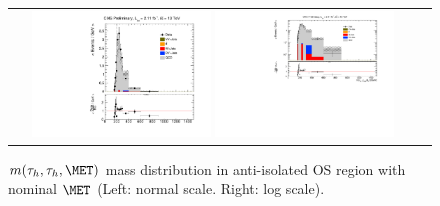 

 \begin{figure}[tbhp!]
      \centering
      \begin{tabular}{cc}
        \includegraphics[width=0.45\textwidth]{QCDBGEst_Closure_SR_1_20_16.pdf}
        \includegraphics[width=0.45\textwidth]{QCD_Closure_SR_FixedTitles_Log_1_26_16.pdf}
      \end{tabular}
     \caption{$m(\tau_{h},\tau_{h},\MET)$ mass distribution in anti-isolated OS region with nominal $\MET$ (Left: normal scale.  Right: log scale).}
    \label{fig:MG306}
 \end{figure}
 
